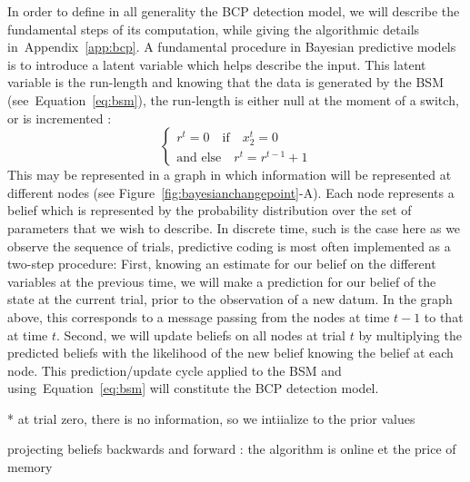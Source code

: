 \documentclass[profile,final,english,draft]{article}%
\newcommand{\choice}[1]{ %
	\left\{ %
		\begin{array}{l} #1 \end{array} %
	\right. }
\newcommand{\eql}[1]{\begin{equation}#1\end{equation}}
\newcommand{\seeFig}[1]{Figure~\ref{fig:#1}}
\newcommand{\seeEq}[1]{Equation~\ref{eq:#1}}
\newcommand{\seeApp}[1]{Appendix~\ref{app:#1}}
\begin{document}
In order to define in all generality the BCP detection model,
we will describe the fundamental steps of its computation,
while giving the algorithmic details in~\seeApp{bcp}.
A fundamental procedure in Bayesian predictive models is to introduce
a latent variable which helps describe the input.
This latent variable is the run-length and
knowing that the data is generated by the BSM (see~\seeEq{bsm}),
the run-length is either null at the moment of a switch,
or is incremented :
\eql{\choice{
r^t = 0 \quad \text{if} \quad x_2^t=0 \\
\text{and else} \quad r^t = r^{t-1} +1 }\label{eq:run_length}}
This may be represented in a graph 
in which information will be represented at different nodes (see \seeFig{bayesianchangepoint}-A). 
Each node represents a belief 
which is represented by the probability distribution 
over the set of parameters that we wish to describe.
In discrete time, such is the case here as we observe the sequence of trials,
predictive coding is most often implemented as a two-step procedure: %
First, knowing an estimate for our belief on the different variables at the previous time,
we will make a prediction for our belief of the state at the current trial,
prior to the observation of a new datum.
In the graph above, this corresponds to a message passing from the nodes at time $t-1$
to that at time $t$.
Second, we will update beliefs on all nodes at trial $t$
by multiplying the predicted beliefs 
with the likelihood of the new belief knowing the belief at each node.
This prediction/update cycle applied to the BSM and using~\seeEq{bsm}
will constitute the BCP detection model.


* at trial zero, there is no information, so we intiialize to the prior values


projecting beliefs backwards and forward  : the algorithm is online et the price of memory
\end{document}
